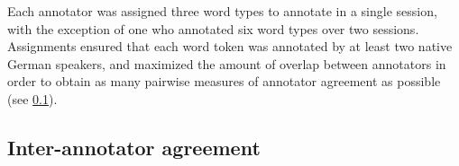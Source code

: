 \documentclass[a4paper]{article}
\begin{document}
		
		
		Each annotator was assigned three word types to annotate in a single session, with the exception of one who annotated six word types over two sessions. 
		Assignments ensured that each word token was annotated by at least two native German speakers, and maximized the amount of overlap between annotators in order to obtain as many pairwise measures of annotator agreement as possible 
		(see \cref{sec:data:agreement}).
		

	
		
		
		\subsection{Inter-annotator agreement}
		\label{sec:data:agreement}		
		
\end{document}
